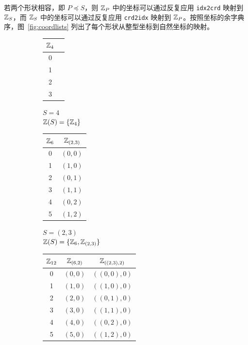 若两个形状相容，即 $P \preceq S$，则 $\mathbb{Z}_P$ 中的坐标可以通过反复应用 \texttt{idx2crd} 映射到 $\mathbb{Z}_S$，而 $\mathbb{Z}_S$ 中的坐标可以通过反复应用 \texttt{crd2idx} 映射到 $\mathbb{Z}_P$。按照坐标的余字典序，图~\ref{fig:coordlists} 列出了每个形状从整型坐标到自然坐标的映射。

\begin{figure}[ht]
\centering
\begin{subfigure}[t]{0.2\textwidth}
    \centering
    \begin{tabular}{|c|c|}
    $\mathbb{Z}_4$ \\
    \hline
    0 \\
    1 \\
    2 \\
    3 \\
    \hline
    \end{tabular}
    \caption*{$S = 4$ \\ $\mathbb{Z}(S) = \{\mathbb{Z}_4\}$}
\end{subfigure}
\begin{subfigure}[t]{0.3\textwidth}
    \centering
    \begin{tabular}{|c|c|}
    $\mathbb{Z}_6$   & $\mathbb{Z}_{(2,3)}$ \\
    \hline
    0        & $(0,0)$ \\
    1        & $(1,0)$ \\
    2        & $(0,1)$ \\
    3        & $(1,1)$ \\
    4        & $(0,2)$ \\
    5        & $(1,2)$ \\
    \hline
    \end{tabular}
    \caption*{$S = (2,3)$ \\ $\mathbb{Z}(S) = \{\mathbb{Z}_6, \mathbb{Z}_{(2,3)}\}$}
\end{subfigure}
\begin{subfigure}[t]{0.4\textwidth}
    \centering
    \begin{tabular}{|c|c|c|}
    $\mathbb{Z}_{12}$ & $\mathbb{Z}_{(6,2)}$ & $\mathbb{Z}_{((2,3),2)}$ \\
    \hline
    0         & $(0,0)$         & $((0,0),0)$ \\
    1         & $(1,0)$         & $((1,0),0)$ \\
    2         & $(2,0)$         & $((0,1),0)$ \\
    3         & $(3,0)$         & $((1,1),0)$ \\
    4         & $(4,0)$         & $((0,2),0)$ \\
    5         & $(5,0)$         & $((1,2),0)$ \\

\end{tabular}
\end{subfigure}
\end{figure}
